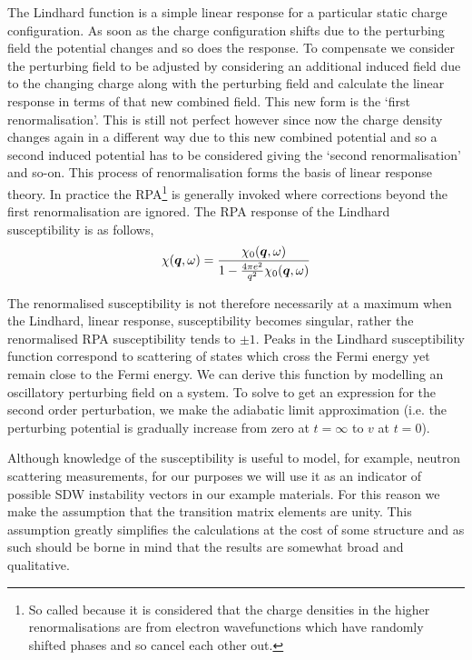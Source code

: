 The Lindhard function is a simple linear response for a particular static charge configuration. As soon as the charge configuration shifts due to the perturbing field the potential changes and so does the response. To compensate we consider the perturbing field to be adjusted by considering an additional induced field due to the changing charge along with the perturbing field and calculate the linear response in terms of that new combined field. This new form is the `first renormalisation'. This is still not perfect however since now the charge density changes again in a different way due to this new combined potential and so a second induced potential has to be considered giving the `second renormalisation' and so-on. This process of renormalisation forms the basis of linear response theory. In practice the \ac{RPA}\footnote{So called because it is considered that the charge densities in the higher renormalisations are from electron wavefunctions which have randomly shifted phases and so cancel each other out.} is generally invoked where corrections beyond the first renormalisation are ignored. The \ac{RPA} response of the Lindhard susceptibility is as follows,
\begin{equation}
    \chi(\boldsymbol{q},\omega) = \frac{\chi_0(\boldsymbol{q}, \omega)}{1 - \frac{4\pi e^2}{q^2} \chi_0(\boldsymbol{q}, \omega)}
\end{equation}

The renormalised susceptibility is not therefore necessarily at a maximum when the Lindhard, linear response, susceptibility becomes singular, rather the renormalised \ac{RPA} susceptibility tends to $\pm1$. Peaks in the Lindhard susceptibility function correspond to scattering of states which cross the Fermi energy yet remain close to the Fermi energy.  We can derive this function by modelling an oscillatory perturbing field on a system. To solve to get an expression for the second order perturbation, we make the adiabatic limit approximation (i.e. the perturbing potential is gradually increase from zero at $t=\infty$ to $v$ at $t=0$).

Although knowledge of the susceptibility is useful to model, for example, neutron scattering measurements, for our purposes we will use it as an indicator of possible \ac{SDW} instability vectors in our example materials. For this reason we make the assumption that the transition matrix elements are unity. This assumption greatly simplifies the calculations at the cost of some structure and as such should be borne in mind that the results are somewhat broad and qualitative.


